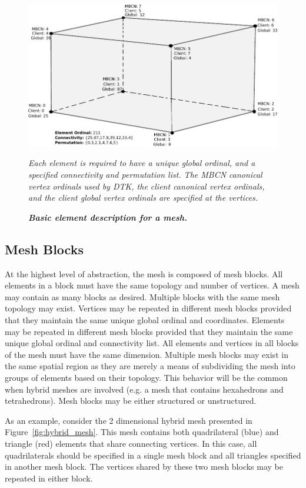 \documentclass[letterpaper,12pt]{article}
\begin{document}
\begin{figure}[htpb!]
  \centering \includegraphics[width=5in]{hex_element.pdf}
  \caption{\bf \sl Basic element description for a mesh.}{\sl Each
    element is required to have a unique global ordinal, and a
    specified connectivity and permutation list. The MBCN canonical
    vertex ordinals used by DTK, the client canonical vertex ordinals,
    and the client global vertex ordinals are specified at the
    vertices.}
  \label{fig:mesh_element}
\end{figure}

\subsection{Mesh Blocks}\label{subsec:blocks}
At the highest level of abstraction, the mesh is composed of mesh
blocks. All elements in a block must have the same topology and number
of vertices. A mesh may contain as many blocks as desired. Multiple
blocks with the same mesh topology may exist. Vertices may be repeated
in different mesh blocks provided that they maintain the same unique
global ordinal and coordinates. Elements may be repeated in different
mesh blocks provided that they maintain the same unique global ordinal
and connectivity list. All elements and vertices in all blocks of the
mesh must have the same dimension. Multiple mesh blocks may exist in
the same spatial region as they are merely a means of subdividing the
mesh into groups of elements based on their topology. This behavior
will be the common when hybrid meshes are involved (e.g. a mesh that
contains hexahedrons and tetrahedrons). Mesh blocks may be either
structured or unstructured.

As an example, consider the 2 dimensional hybrid mesh presented in
Figure~\ref{fig:hybrid_mesh}. This mesh contains both quadrilateral
(blue) and triangle (red) elements that share connecting vertices. In
this case, all quadrilaterals should be specified in a single mesh
block and all triangles specified in another mesh block. The vertices
shared by these two mesh blocks may be repeated in either block.
\end{document}
